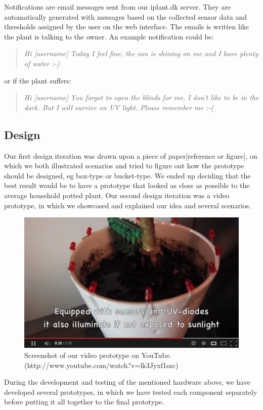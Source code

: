 \documentclass{ubicomp2012}
\begin{document}
Notifications are email messages sent from our iplant.dk server. They are automatically generated with messages based on the collected sensor data and thresholds assigned by the user on the web interface. The emails is written like the plant is talking to the owner.
An example notification could be: 
\begin{quotation}
\emph{Hi [username]
Today I feel fine, the sun is shining on me and I have plenty of water :-) }
\end{quotation}
or if the plant suffers:
\begin{quotation}
\emph{Hi [username]
You forgot to open the blinds for me, I don't like to be in the dark. But I will survive on UV light. Please remember me :-( }
\end{quotation}

\subsection{Design}
Our first design iteration was drawn upon a piece of paper[reference or figure], on which we both illustrated scenarios and tried to figure out how the prototype should be designed, eg box-type or bucket-type. We ended up deciding that the best result would be to have a prototype that looked as close as possible to the average household potted plant.
Our second design iteration was a video prototype, in which we showcased and explained our idea and several scenarios.
\begin{figure}[h!]
\centering
\includegraphics[width=\columnwidth]{iPlant_youtube.png}
\caption{Screenshot of our video prototype on YouTube. (http://www.youtube.com/watch?v=lk3Jyxf1szc)}
\label{fig:iPlant_youtube}
\end{figure}
During the development and testing of the mentioned hardware above, we have developed several prototypes, in which we have tested each component separately before putting it all together to the final prototype.
\end{document}
